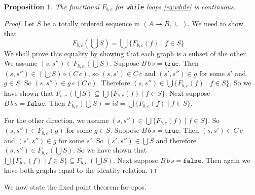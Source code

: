 \documentclass{tufte-handout}
\newcommand{\TRUE}[0]{\mathtt{true}}
\newcommand{\FALSE}[0]{\mathtt{false}}
\newcommand{\pto}[0]{\rightharpoonup}
\newtheorem{proposition}[theorem]{Proposition}
\begin{document}
\begin{proposition}
  The functional $F_{b,c}$ for \texttt{while} loops \eqref{eq:while}
  is continuous.
\end{proposition}
\begin{proof}
  Let $S$ be a totally ordered sequence in $(A\pto B,\subseteq)$.  We
  need to show that
  \[
  F_{b,c}(\bigcup S) = \bigcup \{ F_{b,c}(f) \mid f \in S\}
  \]
  We shall prove this equality by showing that each graph is a subset
  of the other.  We assume $(s,s'') \in F_{b,c}\,(\bigcup S)$.
  Suppose $B\,b\,s = \TRUE$.  Then $(s,s'') \in (\bigcup S) \circ (C
  \, c)$, so $(s,s') \in C\,c$ and $(s',s'') \in g$ for some $s'$ and
  $g \in S$. So $(s,s'') \in g \circ (C\, c)$.  Therefore $(s,s'') \in
  \bigcup \{ F_{b,c}(f) \mid f \in S \}$.  So we have shown that
  $F_{b,c}\,(\bigcup S) \subseteq \bigcup \{ F_{b,c}(f) \mid f \in S
  \}$. Next suppose $B\,b\,s = \FALSE$.  Then
  $
  F_{b,c}(\bigcup S) = \mathit{id} = \bigcup \{ F_{b,c}(f) \mid f \in S\}
  $.

  For the other direction, we assume $(s,s'') \in \bigcup \{
  F_{b,c}(f) \mid f \in S\}$. So $(s,s'') \in F_{b,c}(g)$ for some $g
  \in S$.  Suppose $B\,b\,s = \TRUE$.  Then $(s,s') \in C\,c$ and
  $(s',s'') \in g$ for some $s'$. So $(s',s'') \in \bigcup S$ and
  therefore $(s,s'') \in F_{b,c}(\bigcup S)$.  So we have shown that
  $\bigcup \{ F_{b,c}(f) \mid f \in S \} \subseteq F_{b,c}\,(\bigcup
  S)$. Next suppose $B\,b\,s = \FALSE$. Then again we have both graphs
  equal to the identity relation.
\end{proof}

We now state the fixed point theorem for cpos.
\end{document}
